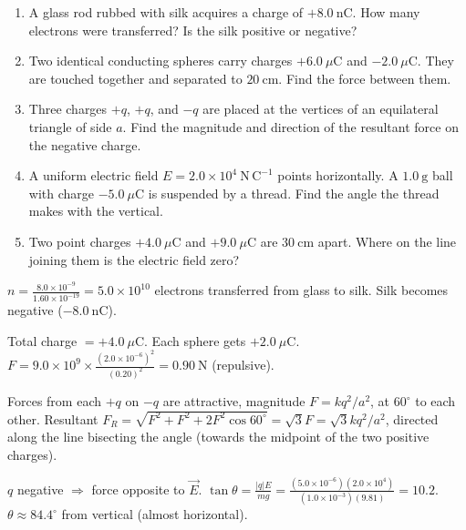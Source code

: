 \documentclass[11pt]{article}
\begin{document}
\begin{exercice}
\begin{enumerate}
\item A glass rod rubbed with silk acquires a charge of $+8.0\ \mathrm{nC}$. How many electrons were transferred? Is the silk positive or negative?
\item Two identical conducting spheres carry charges $+6.0\ \mu\mathrm{C}$ and $-2.0\ \mu\mathrm{C}$. They are touched together and separated to $20\ \mathrm{cm}$. Find the force between them.
\item Three charges $+q$, $+q$, and $-q$ are placed at the vertices of an equilateral triangle of side $a$. Find the magnitude and direction of the resultant force on the negative charge.
\item A uniform electric field $E = 2.0\times 10^4\ \mathrm{N\,C^{-1}}$ points horizontally. A $1.0\ \mathrm{g}$ ball with charge $-5.0\ \mu\mathrm{C}$ is suspended by a thread. Find the angle the thread makes with the vertical.
\item Two point charges $+4.0\ \mu\mathrm{C}$ and $+9.0\ \mu\mathrm{C}$ are $30\ \mathrm{cm}$ apart. Where on the line joining them is the electric field zero?
\end{enumerate}
\end{exercice}

\begin{corrige}[Exercise 1]
$n = \frac{8.0\times 10^{-9}}{1.60\times 10^{-19}} = 5.0\times 10^{10}$ electrons transferred from glass to silk. Silk becomes negative ($-8.0\ \mathrm{nC}$).
\end{corrige}

\begin{corrige}[Exercise 2]
Total charge $= +4.0\ \mu\mathrm{C}$. Each sphere gets $+2.0\ \mu\mathrm{C}$. $F = 9.0\times 10^9 \times \frac{(2.0\times 10^{-6})^2}{(0.20)^2} = 0.90\ \mathrm{N}$ (repulsive).
\end{corrige}

\begin{corrige}[Exercise 3]
Forces from each $+q$ on $-q$ are attractive, magnitude $F = k q^2/a^2$, at $60^\circ$ to each other. Resultant $F_R = \sqrt{F^2+F^2+2F^2\cos 60^\circ} = \sqrt{3}F = \sqrt{3}k q^2/a^2$, directed along the line bisecting the angle (towards the midpoint of the two positive charges).
\end{corrige}

\begin{corrige}[Exercise 4]
$q$ negative $\Rightarrow$ force opposite to $\vec{E}$. $\tan\theta = \frac{|q|E}{mg} = \frac{(5.0\times 10^{-6})(2.0\times 10^4)}{(1.0\times 10^{-3})(9.81)} = 10.2$. $\theta \approx 84.4^\circ$ from vertical (almost horizontal).
\end{corrige}
\end{document}
